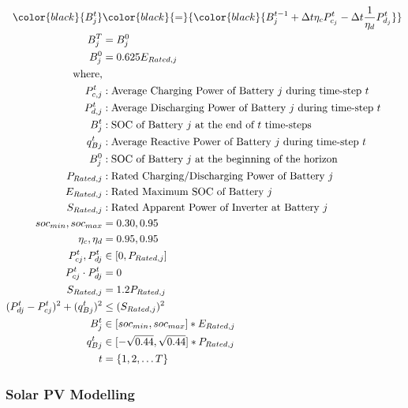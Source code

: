 \begin{gather}
	\begin{align}
		{\color{black}{ B_{j}^{t} }} &\color{black}{=} { \color{black}{ B_{j}^{t-1} + \Delta t  \eta_c P_{c_j}^t - \Delta t\frac{1}{\eta_d} P_{d_j}^t } } \\
		{ B_{j}^{T} } &= { B_{j}^{0}} \\
		{ B_{j}^{0} } &= { 0.625E_{Rated, j} } \\
		{\text{where,}} & {} \nonumber\\
		{P^t_{c,j}} &: {\text{Average Charging Power of Battery $j$ during time-step $t$}} \nonumber\\
		{P^t_{d,j}} &: {\text{Average Discharging Power of Battery $j$ during time-step $t$}} \nonumber\\
		{B^t_j} &: {\text{SOC of Battery $j$ at the end of $t$ time-steps}} \nonumber\\
		{q^t_{Bj}} &: {\text{Average Reactive Power of Battery $j$ during time-step $t$ }} \nonumber\\
		{B^0_j} &: {\text{SOC of Battery $j$ at the beginning of the horizon}} \nonumber\\
		{P_{Rated, j}} &: {\text{Rated Charging/Discharging Power of Battery $j$}} \nonumber\\
		{E_{Rated, j}} &: {\text{Rated Maximum SOC of Battery $j$}} \nonumber\\
		{S_{Rated, j}} &: {\text{Rated Apparent Power of Inverter at Battery $j$}} \nonumber\\
		{ soc_{min}, soc_{max} } &= {0.30, 0.95} \\
		{ \eta_c, \eta_d } &= {0.95, 0.95} \\
		{P^t_{cj}, P^t_{dj}} &\in {[0, P_{Rated, j}]} \\
		{P^t_{cj} \cdot P^t_{dj}} &= {0} \\
		{S_{Rated,j}} &= {1.2P_{Rated,j}} \\
		{ (P^t_{dj} - P^t_{cj})^2 + (q^t_{Bj})^2} &\leq {(S_{Rated,j})^2} \\
		{B^t_{j}} &\in {[soc_{min}, soc_{max}]*E_{Rated, j}} \\
		{q^t_{Bj}} &\in {[-\sqrt{0.44}, \sqrt{0.44}]*P_{Rated,j}} \\
		{t} &= {\{1, 2, \ldots T\}}
	\end{align}
\end{gather}

\subsubsection*{Solar PV Modelling}

